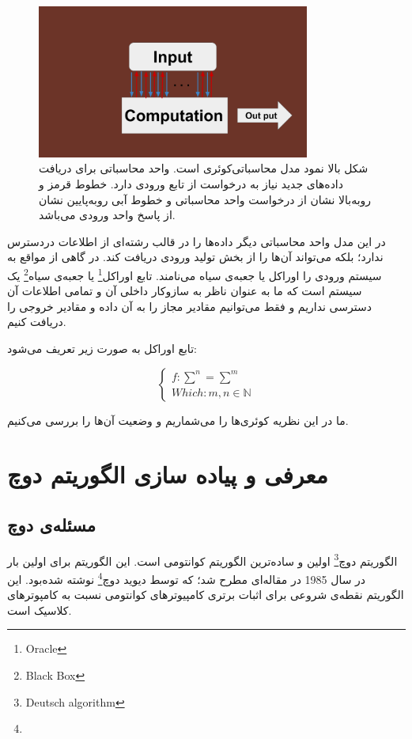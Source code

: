 \documentclass{book}
\begin{document}
\begin{figure}[ht]
	\centering
	\includegraphics[width=0.8\textwidth]{Query computation model.png}
	\caption{شکل بالا نمود مدل محاسباتی‌کوئری است. واحد محاسباتی برای دریافت داده‌های جدید نیاز به درخواست از تابع ورودی دارد. خطوط قرمز و روبه‌بالا نشان از درخواست واحد محاسباتی و خطوط آبی روبه‌پایین نشان از پاسخ واحد ورودی می‌باشد.}
\end{figure}


در این مدل واحد محاسباتی دیگر داده‌ها را در قالب رشته‌ای از اطلاعات دردسترس ندارد؛ بلکه می‌تواند آن‌ها را از بخش تولید ورودی دریافت کند. در گاهی از مواقع به سیستم ورودی را اوراکل یا جعبه‌ی سیاه می‌نامند. تابع اوراکل\footnote{Oracle} یا جعبه‌ی سیاه\footnote{Black Box} یک سیستم است که ما به عنوان ناظر به سازوکار داخلی آن و  تمامی اطلاعات آن دسترسی نداریم و فقط می‌توانیم مقادیر مجاز را به آن داده و مقادیر خروجی را دریافت کنیم. 

تابع اوراکل به صورت زیر تعریف می‌شود:
\begin{center}
	\begin{equation}\label{key}
		\left\{
		\begin{array}{ll}
			f : \sum^n = \sum^m\\
			Which : m, n \in \mathbb{N}
		\end{array}
		\right.
	\end{equation}
\end{center}

ما در این نظریه کوئری‌ها را می‌شماریم و وضعیت آن‌‌ها را بررسی می‌کنیم.

\section{معرفی و پیاده سازی الگوریتم دوچ}

\subsection{مسئله‌ی دوچ}
الگوریتم دوچ\footnote{Deutsch algorithm} اولین و ساده‌ترین الگوریتم کوانتومی‌ است. این الگوریتم برای اولین بار در سال 1985 در مقاله‌ای مطرح شد؛ که توسط دیوید دوچ\footnote{} نوشته شده‌‌بود. این الگوریتم نقطه‌ی شروعی برای اثبات برتری کامپیوترهای کوانتومی نسبت به کامپوترهای کلاسیک است.
\end{document}
